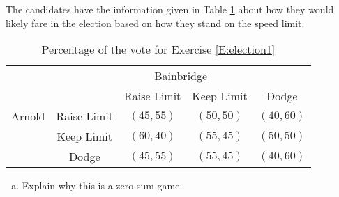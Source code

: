 \begin{xca}\label{E:election1}
The candidates have the information given in Table \ref{T:election1} about how they would likely fare in the election based on how they stand on the speed limit.



\begin{table}[h]
\centering

\begin{tabular}{ccccc}
                      & \multicolumn{4}{c}{Bainbridge}                                                  \\ \cline{2-5} 
\multicolumn{1}{l|}{} & \multicolumn{1}{l|}{} & \multicolumn{1}{c|}{Raise Limit} & \multicolumn{1}{c|}{Keep Limit} & \multicolumn{1}{c|}{Dodge}\\ \cline{2-5} 
\multicolumn{1}{l|}{Arnold} & \multicolumn{1}{c|}{Raise Limit} & \multicolumn{1}{c|}{$(45, 55)$} & \multicolumn{1}{c|}{$(50, 50)$} & \multicolumn{1}{c|}{$(40, 60)$}\\ \cline{2-5} 
\multicolumn{1}{l|}{} & \multicolumn{1}{c|}{Keep Limit} & \multicolumn{1}{c|}{$(60, 40)$} & \multicolumn{1}{c|}{$(55, 45)$} & \multicolumn{1}{c|}{$(50, 50)$}\\ \cline{2-5} 
\multicolumn{1}{l|}{} & \multicolumn{1}{c|}{Dodge} & \multicolumn{1}{c|}{$(45, 55)$} & \multicolumn{1}{c|}{$(55, 45)$} & \multicolumn{1}{c|}{$(40, 60)$} \\ \cline{2-5} 
\end{tabular}
\caption{Percentage of the vote for Exercise \ref{E:election1}}
\label{T:election1}
\end{table}


\begin{enumerate}[(a)]
\item Explain why this is a zero-sum game.


\end{enumerate}
\end{xca}
